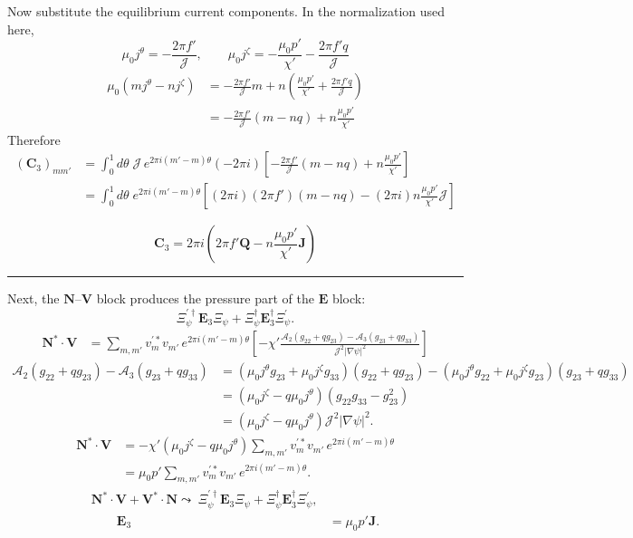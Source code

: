 \documentclass[10pt,a4paper]{article}
\numberwithin{equation}{section}
\begin{document}
Now substitute the equilibrium current components. In the normalization used here,
\begin{equation}
\mu_0 j^\theta = -\frac{2\pi f'}{\mathcal J},
\qquad
\mu_0 j^\zeta = -\frac{\mu_0 p'}{\chi'}-\frac{2\pi f' q}{\mathcal J}
\label{eq:dconcurrents}
\end{equation}
\begin{align}
\mu_0(mj^\theta-nj^\zeta)
&=
-\frac{2\pi f'}{\mathcal J}m
+
n\left(
\frac{\mu_0 p'}{\chi'}
+
\frac{2\pi f'q}{\mathcal J}
\right) \\
&=
-\frac{2\pi f'}{\mathcal J}(m-nq)
+
n\frac{\mu_0 p'}{\chi'}
\end{align}
Therefore
\begin{align}
(\mathbf C_3)_{mm'}
&=
\int_0^1 d\theta\;
\mathcal J\,e^{2\pi i(m'-m)\theta}
(-2\pi i)
\left[
-\frac{2\pi f'}{\mathcal J}(m-nq)
+
n\frac{\mu_0 p'}{\chi'}
\right] \\
&=
\int_0^1 d\theta\;
e^{2\pi i(m'-m)\theta}
\left[
(2\pi i)(2\pi f')(m-nq)
-
(2\pi i)n\frac{\mu_0 p'}{\chi'}\mathcal J
\right]
\end{align}

\begin{equation}
\boxed{
\mathbf C_3
=
2\pi i
\left(
2\pi f' \mathbf Q
-
n\frac{\mu_0 p'}{\chi'}\mathbf J
\right)
}
\end{equation}

\medskip
\noindent\rule{\linewidth}{0.4pt}
\medskip

Next, the $\mathbf N$--$\mathbf V$ block produces the pressure part of the $\mathbf E$ block:
\[
\Xi_\psi^{\prime\dagger}\mathbf E_3 \Xi_\psi + \Xi_\psi^\dagger \mathbf E_3^\dagger \Xi_\psi^\prime.
\]
\begin{align}
\mathbf N^*\cdot \mathbf V
&=
\sum_{m,m'}
v_m^{\prime *}v_{m'}\,e^{2\pi i(m'-m)\theta}
\left[
-\chi'
\frac{
\mathcal A_2(g_{22}+qg_{23})-\mathcal A_3(g_{23}+qg_{33})
}{
\mathcal J^2|\nabla\psi|^2
}
\right]
\end{align}
\begin{align}
\mathcal A_2(g_{22}+qg_{23})-\mathcal A_3(g_{23}+qg_{33})
&=
(\mu_0j^\theta g_{23}+\mu_0j^\zeta g_{33})(g_{22}+qg_{23})
-
(\mu_0j^\theta g_{22}+\mu_0j^\zeta g_{23})(g_{23}+qg_{33}) \\
&=
(\mu_0j^\zeta-q\mu_0j^\theta)(g_{22}g_{33}-g_{23}^2) \\
&=
(\mu_0j^\zeta-q\mu_0j^\theta)\mathcal J^2|\nabla\psi|^2 .
\end{align}
\begin{align}
\mathbf N^*\cdot \mathbf V
&=
-\chi'(\mu_0j^\zeta-q\mu_0j^\theta)
\sum_{m,m'}v_m^{\prime *}v_{m'}\,e^{2\pi i(m'-m)\theta} \\
&=
\mu_0 p'\sum_{m,m'}v_m^{\prime *}v_{m'}\,e^{2\pi i(m'-m)\theta}.
\end{align}
\begin{equation}
\boxed{
\begin{aligned}
\mathbf N^*\cdot \mathbf V+\mathbf V^*\cdot\mathbf N
\leadsto\;
\Xi_\psi^{\prime\dagger}\mathbf E_3 \Xi_\psi
+
\Xi_\psi^\dagger \mathbf E_3^\dagger \Xi_\psi^\prime, \\
\qquad
\mathbf E_3
&=
\mu_0p'\mathbf J .
\end{aligned}
}
\end{equation}
\end{document}
